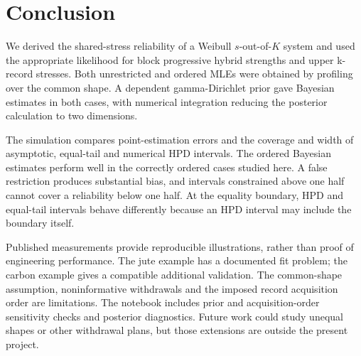 \documentclass[a4paper,11pt]{article}
\begin{document}
\section{Conclusion}\label{sec:conclusion}
We derived the shared-stress reliability of a Weibull $s$-out-of-$K$ system and used the appropriate likelihood for block progressive hybrid strengths and upper k-record stresses. Both unrestricted and ordered MLEs were obtained by profiling over the common shape. A dependent gamma-Dirichlet prior gave Bayesian estimates in both cases, with numerical integration reducing the posterior calculation to two dimensions.

The simulation compares point-estimation errors and the coverage and width of asymptotic, equal-tail and numerical HPD intervals. The ordered Bayesian estimates perform well in the correctly ordered cases studied here. A false restriction produces substantial bias, and intervals constrained above one half cannot cover a reliability below one half. At the equality boundary, HPD and equal-tail intervals behave differently because an HPD interval may include the boundary itself.

Published measurements provide reproducible illustrations, rather than proof of engineering performance. The jute example has a documented fit problem; the carbon example gives a compatible additional validation. The common-shape assumption, noninformative withdrawals and the imposed record acquisition order are limitations. The notebook includes prior and acquisition-order sensitivity checks and posterior diagnostics. Future work could study unequal shapes or other withdrawal plans, but those extensions are outside the present project.

\begingroup
\small


\endgroup
\end{document}
